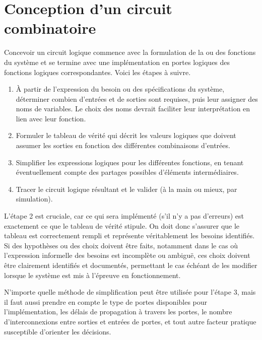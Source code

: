 \documentclass[letter, oneside]{book}
\begin{document}
\section{Conception d'un circuit combinatoire}
\label{sec:orgfa1a632}

Concevoir un circuit logique commence avec la formulation de la ou des
fonctions du système et se termine avec une implémentation en portes
logiques des fonctions logiques correspondantes. Voici les étapes à
suivre.

\begin{enumerate}
\item À partir de l'expression du besoin ou des spécifications du
système, déterminer combien d'entrées et de sorties sont
requises, puis leur assigner des noms de variables. Le choix des noms
devrait faciliter leur interprétation en lien avec leur fonction.

\item Formuler le tableau de vérité qui décrit les valeurs logiques que
doivent assumer les sorties en fonction des différentes
combinaisons d'entrées.

\item Simplifier les expressions logiques pour les différentes fonctions,
en tenant éventuellement compte des partages possibles d'éléments
intermédiaires.

\item Tracer le circuit logique résultant et le valider (à la main ou
mieux, par simulation).
\end{enumerate}

L'étape 2 est cruciale, car ce qui sera implémenté (s'il n'y a pas
d'erreurs) est exactement ce que le tableau de vérité stipule. On
doit donc s'assurer que le tableau est correctement rempli et
représente véritablement les besoins identifiés. Si des hypothèses ou
des choix doivent être faits, notamment dans le cas où l'expression
informelle des besoins est incomplète ou ambiguë, ces choix doivent
être clairement identifiés et documentés, permettant le cas échéant de
les modifier lorsque le système est mis à l'épreuve en fonctionnement.

N'importe quelle méthode de simplification peut être utilisée pour
l'étape 3, mais il faut aussi prendre en compte le type de portes
disponibles pour l'implémentation, les délais de propagation à
travers les portes, le nombre d'interconnexions entre sorties et
entrées de portes, et tout autre facteur pratique susceptible
d'orienter les décisions.
\end{document}
